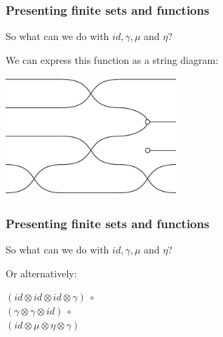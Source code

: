 \documentclass[t, pdftex]{beamer}
\begin{document}
\begin{frame}
    \frametitle{Presenting finite sets and functions}
    So what can we do with $id, \gamma, \mu$ and $\eta$?
    \par
    We can express this function as a string diagram:
    \begin{center}
        \includegraphics[height=4.5cm,keepaspectratio]{figures/dia2.pdf}
    \end{center}

\end{frame}


\begin{frame}
    \frametitle{Presenting finite sets and functions}
    So what can we do with $id, \gamma, \mu$ and $\eta$?
    \par
    Or alternatively:
    \vspace*{\fill}
    \begin{center}
        $(id \otimes id \otimes id \otimes \gamma)\ \circ$\\
        $(\gamma \otimes \gamma \otimes id)\ \circ$\\
        $(id \otimes \mu \otimes \eta \otimes \gamma)$
    \end{center}
    \vspace*{\fill}
\end{frame}
\end{document}

